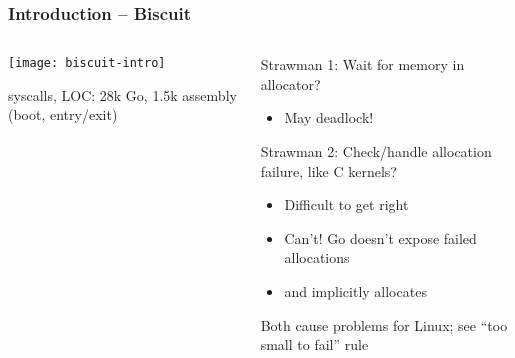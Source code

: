 \begin{frame}[plain]
	\frametitle{Introduction -- Biscuit}
	
	\begin{columns}
		
		\begin{column}{.4\textwidth}
			
			\texttt{[image: biscuit-intro]}
			
			 syscalls, LOC: 28k Go,
			1.5k assembly (boot, entry/exit)
			
		\end{column}
		
		\begin{column}{.6\textwidth}
			Strawman 1: Wait for memory in allocator?

			\begin{itemize}
				\item May deadlock!
				
		    \end{itemize}	
	    
	        Strawman 2: Check/handle allocation failure, like C kernels?
	        
	        \begin{itemize}
				\item Difficult to get right
				\item Can’t! Go doesn’t expose failed allocations
				\item and implicitly allocates
		
			\end{itemize}
		Both cause problems for Linux; see “too small to fail” rule
		
		\end{column}
	\end{columns}	
\end{frame}

